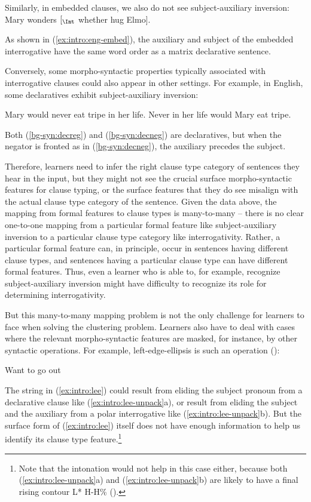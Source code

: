 Similarly, in embedded clauses, we also do not see subject-auxiliary inversion: 
Mary wonders $[_{\Int}$ whether   hug Elmo].
\eex

As shown in (\ref{ex:intro:eng-embed}), the auxiliary  and subject  of the embedded interrogative have the same word order as a matrix declarative sentence.

Conversely, some morpho-syntactic properties typically associated with interrogative clauses could also appear in other settings. For example, in English, some declaratives exhibit subject-auxiliary inversion: 

\bxl\label{bg-syn:decreg}
Mary would never eat tripe in her life. 
\ex\label{bg-syn:decneg} Never in her life would Mary eat tripe.
\exl
\eex

Both (\ref{bg-syn:decreg}) and (\ref{bg-syn:decneg}) are declaratives, but when the negator  is fronted as in (\ref{bg-syn:decneg}), the auxiliary precedes the subject.

Therefore, learners need to infer the right clause type category of sentences they hear in the input, but they might not see the crucial surface morpho-syntactic features for clause typing, or the surface features that they do see misalign with the actual clause type category of the sentence. Given the data above, the mapping from formal features to clause types is many-to-many -- there is no clear one-to-one mapping from a particular formal feature like subject-auxiliary inversion to a particular clause type category like interrogativity. Rather, a particular formal feature can, in principle, occur in sentences having different clause types, and sentences having a particular clause type can have different formal features. Thus, even a learner who is able to, for example, recognize subject-auxiliary inversion might have difficulty to recognize its role for determining interrogativity.

But this many-to-many mapping problem is not the only challenge for learners to face when solving the clustering problem. Learners also have to deal with cases where the relevant morpho-syntactic features are masked, for instance, by other syntactic operations. For example, left-edge-ellipsis is such an operation (\cite{zwickypullum1983leftedge}):

Want to go out
\eex

The string in (\ref{ex:intro:lee}) could result from eliding the subject pronoun from a declarative clause like (\ref{ex:intro:lee-unpack}a), or result from eliding the subject and the auxiliary from a polar interrogative like (\ref{ex:intro:lee-unpack}b). But the surface form of (\ref{ex:intro:lee}) itself does not have enough information to help us identify its clause type feature.\footnote{Note that the intonation would not help in this case either, because both (\ref{ex:intro:lee-unpack}a) and (\ref{ex:intro:lee-unpack}b) are likely to have a final rising contour L* H-H\% (\cite{gunlogson2008, jeong2018, goodhue2021rd}). } 

